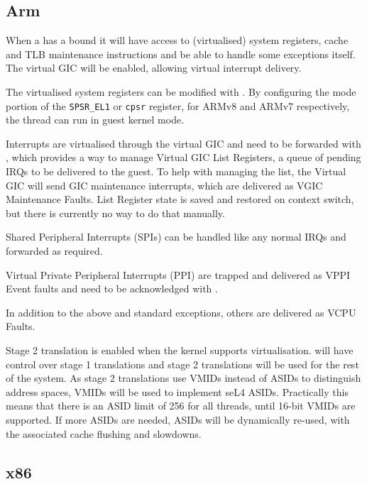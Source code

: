\subsection{Arm}
\label{sec:virt-arm}

When a  has a bound  it will have access to (virtualised) system registers,
cache and TLB maintenance instructions and be able to handle some exceptions itself.
The virtual GIC will be enabled, allowing virtual interrupt delivery.

The virtualised system registers can be modified with .
By configuring the mode portion of the \texttt{SPSR\_EL1} or \texttt{cpsr} register,
for ARMv8 and ARMv7 respectively, the thread can run in guest kernel mode.

Interrupts are virtualised through the virtual GIC and need to be forwarded with
, which provides a way to manage
Virtual GIC List Registers, a queue of pending IRQs to be delivered to the guest. To help
with managing the list, the Virtual GIC will send GIC maintenance interrupts, which are
delivered as VGIC Maintenance Faults. List Register state is saved and restored on 
context switch, but there is currently no way to do that manually.

Shared Peripheral Interrupts (SPIs) can be handled like any normal IRQs and forwarded as required.

Virtual Private Peripheral Interrupts (PPI) are trapped and delivered as VPPI Event faults and need
to be acknowledged with .

In addition to the above and standard exceptions, others are delivered as VCPU Faults.

Stage 2 translation is enabled when the kernel supports virtualisation.  will have control
over stage 1 translations and stage 2 translations will be used for the rest of the system.
As stage 2 translations use VMIDs instead of ASIDs to distinguish address spaces, VMIDs will be used
to implement seL4 ASIDs. Practically this means that there is an ASID limit of 256 for all threads,
until 16-bit VMIDs are supported. If more ASIDs are needed, ASIDs will be dynamically re-used, with
the associated cache flushing and slowdowns.

\subsection{x86}

